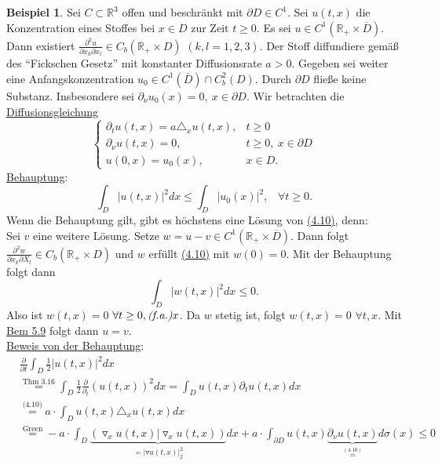 \documentclass[a4paper]{report}
\newcommand{\R}{\mathbb{R}}
\newcommand{\jlabel}[1]{\label{j_#1}}
\newcommand{\jterm}[1]{\jlabel{#1}\uline{#1}}
\newcommand{\jshortlink}[1]{\jhyperref{#1}{\text{#1}}}
\newcommand{\jhyperref}[2]{\hyperref[j_#1]{#2}}
\newcommand{\jlink}[1]{\jhyperref{#1}{#1}}
\newcommand{\fa}{\text{\textit{(f.a.)}}}
\theoremstyle{plain}
\theoremstyle{definition}
\newtheorem{expl}[thm]{Beispiel}
\begin{document}
{{{{\begin{expl}
    \jlabel{Bsp 4.21}
    Sei $C\subset \R^3$ offen und beschränkt mit $\partial D\in C^1$. Sei $u(t,x)$ die Konzentration eines Stoffes bei $x\in D$ zur Zeit $t\ge 0$. Es sei $u\in C^1(\R_+ \times \overline{D})$. Dann existiert $\frac{\partial^2 u}{\partial x_k \partial x_l} \in C_b(\R_+\times D)$ $(k,l=1,2,3)$. Der Stoff diffundiere gemäß des ``Fickschen Gesetz'' mit konstanter Diffusionsrate $a>0$. Gegeben sei weiter eine Anfangskonzentration $u_0 \in C^1(\overline{D}) \cap C_b^2(D)$. Durch $\partial D$ fließe keine Substanz. Insbesondere sei $\partial_\nu u_0(x) = 0, \ x\in \partial D$. Wir betrachten die \jterm{Diffusionsgleichung}
    \begin{equation}
        \jlabel{(4.10)}
        \begin{cases}
            \partial_t u(t,x) = a\triangle_x u(t,x), &t\ge 0\\
            \partial_\nu u(t,x) = 0, &t\ge 0,\ x\in \partial D\\
            u(0,x) = u_0(x), &x\in D.
        \end{cases}
    \end{equation}
    \uline{Behauptung}:
    \[
        \int_D |u(t,x)|^2 dx \le \int_D |u_0(x)|^2, \hspace{10pt} \forall t\ge 0.
    \]
    Wenn die Behauptung gilt, gibt es höchstens eine Lösung von \jlink{(4.10)}, denn:\\
    Sei $v$ eine weitere Lösung. Setze $w=u-v \in C^1(\R_+\times \overline{D})$. Dann folgt $\frac{\partial^2 w}{\partial x_k \partial X_l} \in C_b(\R_+\times D)$ und $w$ erfüllt \jlink{(4.10)} mit $w(0) = 0$. Mit der Behauptung folgt dann
    \[
        \int_D |w(t,x)|^2 dx \le 0.
    \]
    Also ist $w(t,x)=0$ $\forall t\ge0, \fa x$. Da $w$ stetig ist, folgt $w(t,x)=0$ $\forall t,x$. Mit \jlink{Bem 5.9} folgt dann $u=v$.\\
    \uline{Beweis von der Behauptung}:
    \[
        \begin{split}
            &\frac{\partial}{\partial t} \int_D \frac{1}{2}|u(t,x)|^2 dx\\
            &\overset{\jshortlink{Thm 3.16}}{=} \int_D \frac{1}{2}\frac{\partial}{\partial_t} (u(t,x))^2 dx = \int_D u(t,x)\partial_t u(t,x) dx\\
            &\overset{\jshortlink{(4.10)}}{=} a\cdot \int_D u(t,x) \triangle_x u(t,x) dx\\
            &\overset{\jshortlink{Green}}{=} -a\cdot \int_D \underbrace{(\triangledown_x u(t,x)|\triangledown_x u(t,x))}_{=|\triangledown u(t,x)|_2^2}dx + a \cdot \int_{\partial D} u(t,x) \underbrace{\partial_\nu u(t,x)}_{\overset{\jlink{(4.10)}}{=}} d\sigma(x) \le 0
        \end{split}
    \]


\end{expl}}}}}
\end{document}
